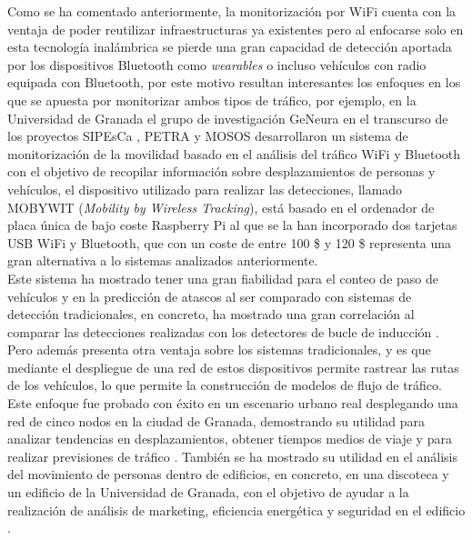 \documentclass[../proyecto.tex]{subfiles}
\begin{document}
Como se ha comentado anteriormente, la monitorización por WiFi cuenta con la ventaja de poder reutilizar infraestructuras ya existentes pero al enfocarse solo en esta tecnología inalámbrica se pierde una gran capacidad de detección aportada por los dispositivos Bluetooth como \textit{wearables} o incluso vehículos con radio equipada con Bluetooth, por este motivo resultan interesantes los enfoques en los que se apuesta por monitorizar ambos tipos de tráfico, por ejemplo, en la Universidad de Granada el grupo de investigación GeNeura en el transcurso de los proyectos SIPEsCa \cite{CASTILLO2014}, PETRA \cite{CASTILLO2015}\cite{RIVAS2015} y MOSOS \cite{proyecto_mosos} desarrollaron un sistema de monitorización de la movilidad basado en el análisis del tráfico WiFi y Bluetooth con el objetivo de recopilar información sobre desplazamientos de personas y vehículos, el dispositivo utilizado para realizar las detecciones, llamado MOBYWIT (\textit{Mobility by Wireless Tracking}), \cite{FERNANDEZARES201607} está basado en el ordenador de placa única de bajo coste Raspberry Pi al que se la han incorporado dos tarjetas USB WiFi y Bluetooth, que con un coste de entre 100 \$ y 120 \$ representa una gran alternativa a lo sistemas analizados anteriormente.\\

Este sistema ha mostrado tener una gran fiabilidad para el conteo de paso de vehículos y en la predicción de atascos al ser comparado con sistemas de detección tradicionales, en concreto, ha mostrado una gran correlación al comparar las detecciones realizadas con los detectores de bucle de inducción \cite{FERNANDEZARES201606}. Pero además presenta otra ventaja sobre los sistemas tradicionales, y es que mediante el despliegue de una red de estos dispositivos permite rastrear las rutas de los vehículos, lo que permite la construcción de modelos de flujo de tráfico. Este enfoque fue probado con éxito en un escenario urbano real desplegando una red de cinco nodos en la ciudad de Granada, demostrando su utilidad para analizar tendencias en desplazamientos, obtener tiempos medios de viaje y para realizar previsiones de tráfico \cite{FERNANDEZARES201722}. También se ha mostrado su utilidad en el análisis del movimiento de personas dentro de edificios, en concreto, en una discoteca y un edificio de la Universidad de Granada, con el objetivo de ayudar a la realización de análisis de marketing, eficiencia energética y seguridad en el edificio \cite{FERNANDEZARES2017163}.\\
\end{document}
